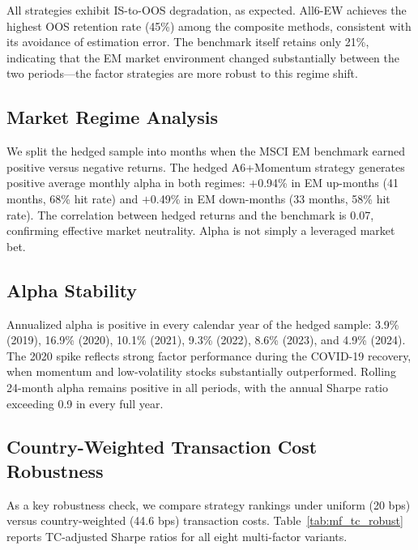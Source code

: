 \documentclass[12pt]{article}
\begin{document}
All strategies exhibit IS-to-OOS degradation, as expected. All6-EW achieves the highest OOS retention rate (45\%) among the composite methods, consistent with its avoidance of estimation error. The benchmark itself retains only 21\%, indicating that the EM market environment changed substantially between the two periods---the factor strategies are more robust to this regime shift.

\subsection{Market Regime Analysis}

We split the hedged sample into months when the MSCI EM benchmark earned positive versus negative returns. The hedged A6+Momentum strategy generates positive average monthly alpha in both regimes: $+$0.94\% in EM up-months (41 months, 68\% hit rate) and $+$0.49\% in EM down-months (33 months, 58\% hit rate). The correlation between hedged returns and the benchmark is 0.07, confirming effective market neutrality. Alpha is not simply a leveraged market bet.

\subsection{Alpha Stability}

Annualized alpha is positive in every calendar year of the hedged sample: 3.9\% (2019), 16.9\% (2020), 10.1\% (2021), 9.3\% (2022), 8.6\% (2023), and 4.9\% (2024). The 2020 spike reflects strong factor performance during the COVID-19 recovery, when momentum and low-volatility stocks substantially outperformed. Rolling 24-month alpha remains positive in all periods, with the annual Sharpe ratio exceeding 0.9 in every full year.

\subsection{Country-Weighted Transaction Cost Robustness}

As a key robustness check, we compare strategy rankings under uniform (20 bps) versus country-weighted (44.6 bps) transaction costs. Table~\ref{tab:mf_tc_robust} reports TC-adjusted Sharpe ratios for all eight multi-factor variants.
\end{document}
